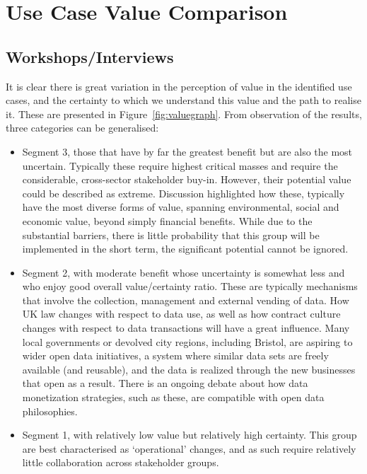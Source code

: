 \documentclass[journal]{IEEEtran}
\begin{document}
\section{Use Case Value Comparison}\label{usecasecomp}

\subsection{Workshops/Interviews}

It is clear there is great variation in the perception of value in the
identified use cases, and the certainty to which we understand this
value and the path to realise it. These are presented in
Figure~\ref{fig:valuegraph}. From observation of the results, three
categories can be generalised:

\begin{itemize}
\item Segment 3, those that have by far the greatest benefit but are
  also the most uncertain. Typically these require highest critical
  masses and require the considerable, cross-sector stakeholder
  buy-in. However, their potential value could be described as
  extreme. Discussion highlighted how these, typically have the most
  diverse forms of value, spanning environmental, social and economic
  value, beyond simply financial benefits. While due to the
  substantial barriers, there is little probability that this group
  will be implemented in the short term, the significant potential
  cannot be ignored.
\item Segment 2, with moderate benefit whose uncertainty is somewhat
  less and who enjoy good overall value/certainty ratio. These are
  typically mechanisms that involve the collection, management and
  external vending of data. How UK law changes with respect to data
  use, as well as how contract culture changes with respect to data
  transactions will have a great influence. Many local governments or
  devolved city regions, including Bristol, are aspiring to wider open
  data initiatives, a system where similar data sets are freely
  available (and reusable), and the data is realized through the new
  businesses that open as a result. There is an ongoing debate about
  how data monetization strategies, such as these, are compatible with
  open data philosophies.
\item Segment 1, with relatively low value but relatively high
  certainty. This group are best characterised as `operational'
  changes, and as such require relatively little collaboration across
  stakeholder groups. 
\end{itemize}
\end{document}
